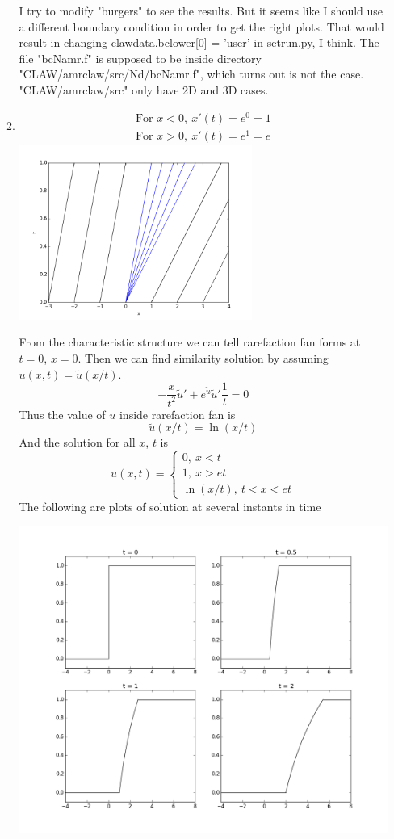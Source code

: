 \documentclass[11pt]{article}
\begin{document}
\begin{enumerate}
\begin{enumerate}
				I try to modify "burgers" to see the results. But it seems like I should use a different boundary condition in order to get the right plots. That would result in changing clawdata.bclower[0] = 'user' in setrun.py, I think. The file "bcNamr.f" is supposed to be inside directory "CLAW/amrclaw/src/Nd/bcNamr.f", which turns out is not the case. "CLAW/amrclaw/src" only have 2D and 3D cases.
			\item
				\begin{align*}
				\text{For } x<0,\ x'(t)=e^0=1\\
				\text{For } x>0,\ x'(t)=e^1=e
				\end{align*}
				\hfil\includegraphics[width=3.0in]{problem_11_8b_char.png}\hfil	
				
				From the characteristic structure we can tell rarefaction fan forms at $t=0$, $x=0$. Then we can find similarity solution by assuming $u(x,t)=\tilde{u}(x/t)$.
				\[
				-\frac{x}{t^2}\tilde{u}'+e^{\tilde{u}}\tilde{u}'\frac{1}{t}=0
				\]
				Thus the value of $u$ inside rarefaction fan is 
				\[
				\tilde{u}(x/t)=\ln(x/t)
				\]			
				And the solution for all $x$, $t$ is 
				\[
				u(x,t)=\begin{cases}0, \ x<t \\ 1, \ x>et\\ \ln(x/t), \ t<x<et \end{cases}
				\]
				The following are plots of solution at several instants in time
				
				\hfil\includegraphics[width=6.0in]{problem_11_8b.png}\hfil
				

\end{enumerate}
\end{enumerate}
\end{document}
